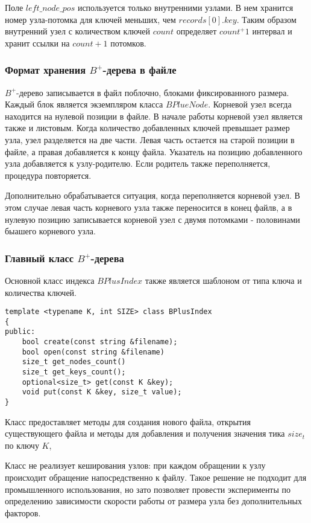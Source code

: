 \documentclass[14pt, russian]{scrartcl}
\begin{document}
Поле $left\_node\_pos$ используется только внутренними узлами. В нем хранится номер узла-потомка для ключей меньших,
чем $records[0].key$. Таким образом внутренний узел с количеством ключей $count$ определяет $count^+1$ интервал и хранит ссылки на $count+1$ потомков.

\subsubsection{Формат хранения $B^+$-дерева в файле}

$B^+$-дерево записывается в файл поблочно, блоками фиксированного размера. Каждый блок является экземпляром класса 
$BPlueNode$. Корневой узел всегда находится на нулевой позиции в файле. В начале работы корневой узел является также и листовым. Когда количество добавленных ключей превышает размер узла, узел разделяется на две части. Левая часть остается на старой позиции в файле, а правая добавляется к концу файла. Указатель на позицию добавленного узла добавляется к узлу-родителю. Если родитель также переполняется, процедура повторяется.

Дополнительно обрабатывается ситуация, когда переполняется корневой узел. В этом случае левая часть корневого узла
также переносится в конец файлв, а в нулевую позицию записывается корневой узел с двумя потомками - половинами 
быашего корневого узла. 

\subsubsection{Главный класс $B^+$-дерева}

Основной класс индекса $BPlusIndex$ также является шаблоном от типа ключа и количества ключей.

\begin{verbatim}
template <typename K, int SIZE> class BPlusIndex
{
public:
    bool create(const string &filename);
    bool open(const string &filename)
    size_t get_nodes_count()
    size_t get_keys_count();
    optional<size_t> get(const K &key);
    void put(const K &key, size_t value);
}
\end{verbatim}

Класс предоставляет методы для создания нового файла, открытия существующего файла и методы для добавления и получения
значения тика $size_t$ по ключу $K$, 

Класс не реализует кеширования узлов: при каждом обращении к узлу происходит
обращение напосредственно к файлу. Такое решение не подходит для промышленного использования, но зато позволяет провести эксперименты по определению зависимости скорости работы от размера узла без дополнительных факторов.
\end{document}
